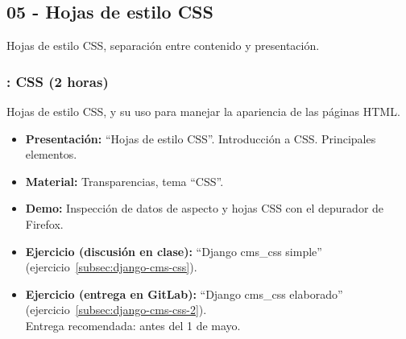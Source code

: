 \documentclass[a4paper,12pt]{article}
\begin{document}
%
%
%
%
\subsection{05 - Hojas de estilo CSS}

Hojas de estilo CSS, separación entre contenido y presentación.

\subsubsection{\lunesL: CSS (2 horas)}
\label{cal:lunesL}

Hojas de estilo CSS, y su uso para manejar la apariencia de las páginas HTML.

\begin{itemize}
\item \textbf{Presentación:} ``Hojas de estilo CSS''. Introducción a CSS. Principales elementos.
 \item \textbf{Material:} Transparencias, tema ``CSS''.
\item \textbf{Demo:} Inspección de datos de aspecto y hojas CSS con el depurador de Firefox.
\item \textbf{Ejercicio (discusión en clase):} ``Django cms\_css simple'' (ejercicio~\ref{subsec:django-cms-css}).
\item \textbf{Ejercicio (entrega en GitLab):} ``Django cms\_css elaborado'' (ejercicio~\ref{subsec:django-cms-css-2}). \\
  Entrega recomendada: antes del 1 de mayo.
\end{itemize}
\end{document}
